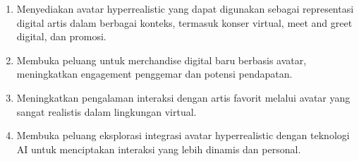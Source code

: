 \begin{enumerate}
    \item Menyediakan avatar hyperrealistic yang dapat digunakan sebagai representasi digital artis dalam berbagai konteks, termasuk konser virtual, meet and greet digital, dan promosi.
    \item Membuka peluang untuk merchandise digital baru berbasis avatar, meningkatkan engagement penggemar dan potensi pendapatan.
    \item Meningkatkan pengalaman interaksi dengan artis favorit melalui avatar yang sangat realistis dalam lingkungan virtual.
    \item Membuka peluang eksplorasi integrasi avatar hyperrealistic dengan teknologi AI untuk menciptakan interaksi yang lebih dinamis dan personal.
\end{enumerate}

